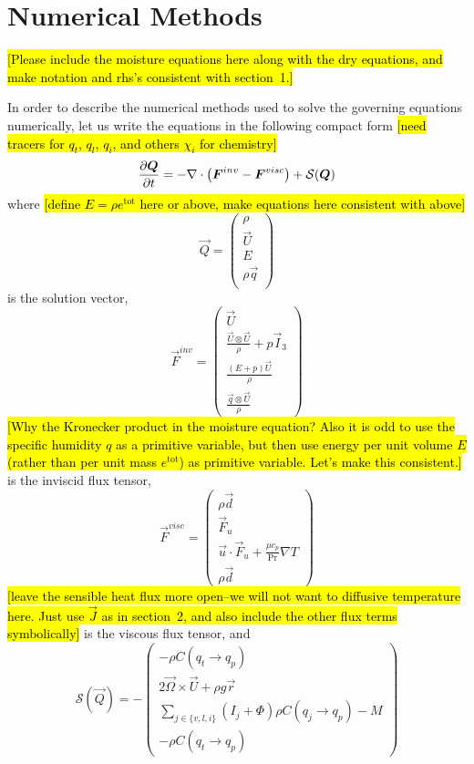\documentclass{article}
\begin{document}
\section{Numerical Methods}
\label{sec:numerical_methods}

\hl{[Please include the moisture equations here along with the dry equations, and make notation and rhs's consistent with section~1.]}

In order to describe the numerical methods used to solve the governing equations numerically, let us write the equations in the following compact form \hl{[need tracers for $q_t$, $q_l$, $q_i$, and others $\chi_i$ for chemistry]}
\[
\frac{\partial \boldsymbol{{Q}}}{\partial t} = - \nabla \cdot \left( \boldsymbol{{F}}^{inv} - \boldsymbol{{F}}^{visc} \right) + \mathcal{S}(\boldsymbol{{Q}})
\]
where \hl{[define $E = \rho e^{\mathrm{tot}}$ here or above, make equations here consistent with above]}
\[
\vec{Q}=\left( \begin{array}{c}
\rho \\
\vec{U} \\
 E\\
\rho \vec{q}\\
\end{array}
\right)
\]
 is the solution vector, 
 \[
 \vec{F}^{inv}=\left( \begin{array}{c}
 \vec{U} \\
 \frac{\vec{U} \otimes \vec{U}}{\rho} + p \vec{I}_3 \\
\frac{(E+p) \vec{U}}{\rho}\\
\frac{\vec{q} \otimes \vec{U}}{\rho}
\end{array}
\right)
 \]
 \hl{[Why the Kronecker product in the moisture equation? Also it is odd to use the specific humidity $q$ as a primitive variable, but then use energy per unit volume $E$ (rather than per unit mass $e^\mathrm{tot}$) as primitive variable. Let's make this consistent.]} is the inviscid flux tensor, 
 \[
 \vec{F}^{visc}=\left( \begin{array}{c}
 \rho\vec{d} \\
 \vec{F}_u \\
\vec{u} \cdot \vec{F}_u + \frac{\mu c_p}{\mathrm{Pr}} \nabla T\\
\rho\vec{d}
\end{array}
\right)
 \] \hl{[leave the sensible heat flux more open--we will not want to diffusive temperature here. Just use $\vec{J}$ as in section~2, and also include the other flux terms symbolically]} is the viscous flux tensor, and
 \[
 \mathcal{S}(\vec{Q})= - \left( \begin{array}{c}
 -\rho C(q_t \rightarrow q_p) \\
 2 \vec{\Omega} \times \vec{U} + \rho g \vec{r} \\
 \sum_{j\in\{v,l,i\}}(I_j + \Phi)  \rho C(q_j \rightarrow q_p) - M \\
-\rho C(q_t \rightarrow q_p)
\end{array}
\right)
 \]
\end{document}
